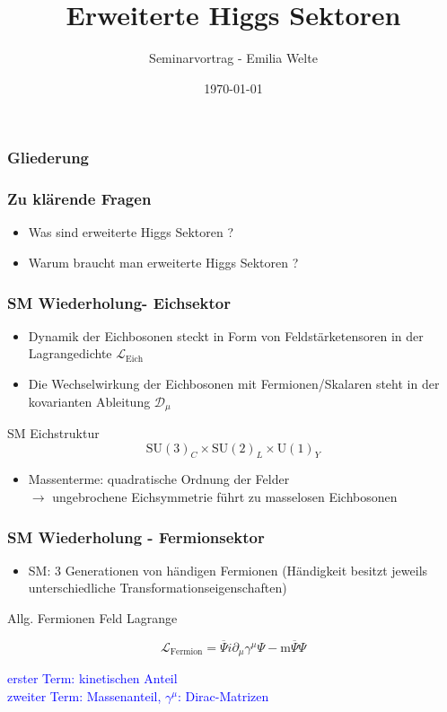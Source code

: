 \documentclass[xcolor=dvipsnames]{beamer}
\title{Erweiterte Higgs Sektoren}
\author{Seminarvortrag - Emilia Welte}
\date{ \today}
\begin{document}
\begin{frame} 
\titlepage
\end{frame}


\begin{frame}[t]
\frametitle{Gliederung}
\tableofcontents
\end{frame}

\begin{frame}
\frametitle{Zu klärende Fragen}
\begin{itemize}
\item Was sind erweiterte Higgs Sektoren ?
\item Warum braucht man erweiterte Higgs Sektoren ?
\end{itemize}
\end{frame}

\begin{frame}

\frametitle{SM Wiederholung- Eichsektor}
\begin{itemize}
\item Dynamik der Eichbosonen steckt in Form von Feldstärketensoren in der Lagrangedichte $\mathscr{L}_{\text{Eich}}$
\item Die Wechselwirkung der Eichbosonen mit Fermionen/Skalaren steht in der kovarianten Ableitung $\mathscr{D}_{\mu}$
\end{itemize}

\begin{block}{SM Eichstruktur}
\begin{equation*}
\text{SU}(3)_{C}\times \text{SU}(2)_{L} \times \text{U}(1)_{Y} 
\end{equation*}
\end{block}

\begin{itemize}
\item Massenterme: quadratische Ordnung der Felder \\ $\rightarrow$ ungebrochene Eichsymmetrie führt zu masselosen Eichbosonen
\end{itemize}

\end{frame}

\begin{frame}
\frametitle{SM Wiederholung - Fermionsektor}
\begin{itemize}
\item SM: 3 Generationen von händigen Fermionen (Händigkeit besitzt jeweils unterschiedliche Transformationseigenschaften)
\end{itemize}
\begin{block}{Allg. Fermionen Feld Lagrange}

\begin{equation*}
\mathscr{L}_{\text{Fermion}}=\overline{\Psi} i \partial_{\mu} \gamma^{\mu} \Psi -\text{m}\overline{\Psi} \Psi 
\end{equation*}
\end{block}
\textcolor{Blue}{erster Term: kinetischen Anteil \\ zweiter Term: Massenanteil,  $\gamma^{\mu}$: Dirac-Matrizen \autocite{4}}
\end{frame}
\end{document}
